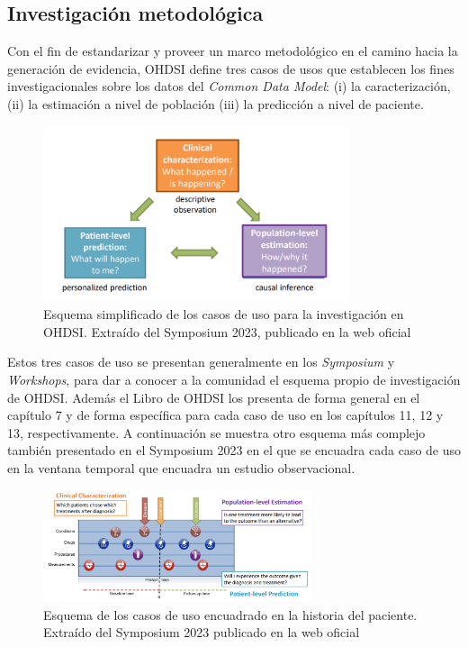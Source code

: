 \subsection{Investigación metodológica} \label{subsec:05investMetodolog}

Con el fin de estandarizar y proveer un marco metodológico en el camino hacia la generación de evidencia, OHDSI define tres casos de usos que establecen los fines investigacionales sobre los datos del \textit{Common Data Model}: (i) la caracterización, (ii) la estimación a nivel de población (iii) la predicción a nivel de paciente. 

\begin{figure}[H]
\centering
\includegraphics[width=0.80\textwidth]{figures/useCases.png}
     \caption{Esquema simplificado de los casos de uso para la investigación en OHDSI. Extraído del Symposium 2023, publicado en la web oficial \cite{OHDSIwebsite}}
    \label{fig:useCases}
\end{figure}

Estos tres casos de uso se presentan generalmente en los \textit{Symposium} y \textit{Workshops}, para dar a conocer a la comunidad el esquema propio de investigación de OHDSI. Además el Libro de OHDSI \cite{OHDSIbook} los presenta de forma general en el capítulo 7 y de forma específica para cada caso de uso en los capítulos 11, 12 y 13, respectivamente. A continuación se muestra otro esquema más complejo también presentado en el Symposium 2023 en el que se encuadra cada caso de uso en la ventana temporal que encuadra un estudio observacional.


\begin{figure}[H]
\centering
\includegraphics[width=0.70\textwidth]{figures/useCasesJourney.png}
     \caption{Esquema de los casos de uso encuadrado en la historia del paciente. Extraído del Symposium 2023 publicado en la web oficial \cite{OHDSIwebsite}}
    \label{fig:useCasesJourney}
\end{figure}

